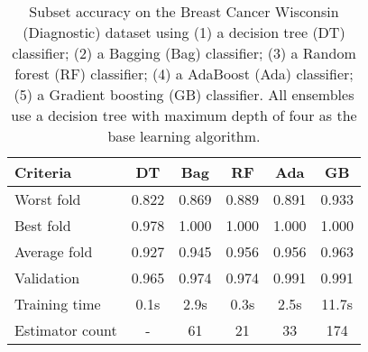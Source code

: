 \begin{table}[htbp]
    \centering
    \begin{tabular}{l c c c c c}
    \toprule
    Criteria        & DT    & Bag       & RF    & Ada   & GB \\
    \midrule
    Worst fold      & 0.822 & 0.869     & 0.889 & 0.891 & 0.933\\
    Best fold       & 0.978 & 1.000     & 1.000 & 1.000 & 1.000\\
    Average fold    & 0.927 & 0.945     & 0.956 & 0.956 & 0.963\\
    Validation      & 0.965 & 0.974     & 0.974 & 0.991 & 0.991\\
    Training time   & 0.1s  & 2.9s      & 0.3s  & 2.5s  & 11.7s\\
    Estimator count & -     & 61        & 21    & 33    & 174 \\
    \bottomrule
    \end{tabular}
    \caption{
        Subset accuracy on the Breast Cancer Wisconsin (Diagnostic) dataset using 
        (1) a decision tree (DT) classifier;
        (2) a Bagging (Bag) classifier;
        (3) a Random forest (RF) classifier; 
        (4) a AdaBoost (Ada) classifier; 
        (5) a Gradient boosting (GB) classifier.
        All ensembles use a decision tree with maximum depth of four as 
        the base learning algorithm.
    }
\end{table}
